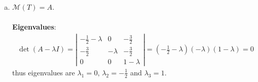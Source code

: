\documentclass[12pt, letterpaper]{scrartcl}
\begin{document}
\begin{enumerate}[(a)]
    \item $\mathcal{M}(T)=A$.\\\\
    \textbf{Eigenvalues}:
     \begin{align*}
         \det (A-\lambda I)=
         \left|
         \begin{array}{ccc}
              -\frac{1}{2}-\lambda&0&-\frac{3}{2}\\
              -\frac{3}{2}&-\lambda&-\frac{3}{2}\\
              0&0&1-\lambda
         \end{array}
         \right|
         =(-\frac{1}{2}-\lambda)(-\lambda)(1-\lambda)
         =0
     \end{align*}
     thus eigenvalues are $\lambda_1=0$, $\lambda_2=-\frac{1}{2}$ and $\lambda_3=1$.\\
     

\end{enumerate}
\end{document}
